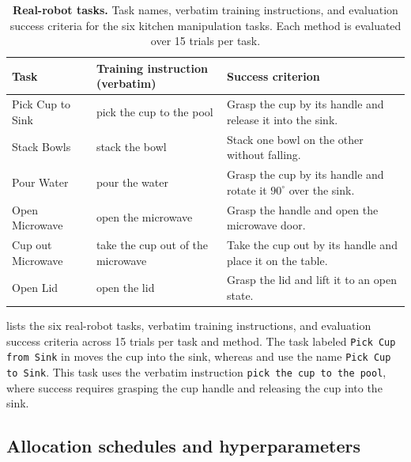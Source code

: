 \begin{table}[!htbp]
  \centering
  \caption{\textbf{Real-robot tasks.}
  Task names, verbatim training instructions, and evaluation success criteria for the six kitchen manipulation tasks.
  Each method is evaluated over 15 trials per task.}
  \label{tab:supp_robot_tasks}
  \scriptsize
  \setlength{\tabcolsep}{3pt}
  \begin{tabularx}{\linewidth}{@{}l>{\raggedright\arraybackslash}p{2.5cm}>{\raggedright\arraybackslash}X@{}}
    \toprule
    Task & Training instruction (verbatim) & Success criterion \\
    \midrule
    Pick Cup to Sink & pick the cup to the pool & Grasp the cup by its handle and release it into the sink. \\
    Stack Bowls & stack the bowl & Stack one bowl on the other without falling. \\
    Pour Water & pour the water & Grasp the cup by its handle and rotate it $90^\circ$ over the sink. \\
    Open Microwave & open the microwave& Grasp the handle and open the microwave door. \\
    Cup out Microwave & take the cup out of the microwave & Take the cup out by its handle and place it on the table. \\
    Open Lid & open the lid & Grasp the lid and lift it to an open state. \\
    \bottomrule
  \end{tabularx}
\end{table}

     lists the six real-robot tasks, verbatim training instructions, and evaluation success criteria across 15 trials per task and method.
    The task labeled \texttt{Pick Cup from Sink} in  moves the cup into the sink, whereas  and  use the name \texttt{Pick Cup to Sink}.
    This task uses the verbatim instruction \texttt{pick the cup to the pool}, where success requires grasping the cup handle and releasing the cup into the sink.



\subsection{Allocation schedules and hyperparameters}
\label{app:supp_schedules}

